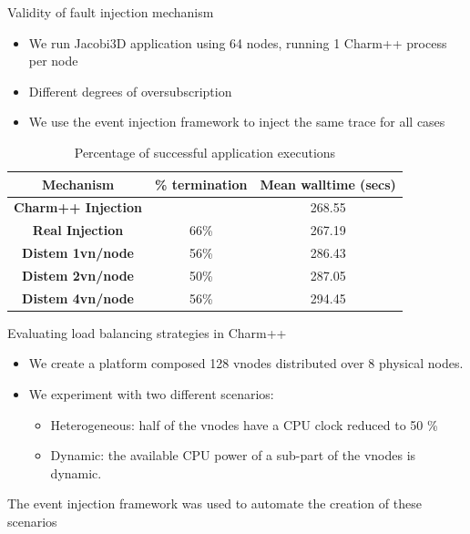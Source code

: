 \documentclass[11pt,xcolor=dvipsnames,presentation]{beamer}
\begin{document}
\begin{frame}[label=sec-2-0-3]{Validity of fault injection mechanism}
\begin{itemize}
\item We run Jacobi3D application using 64 nodes, running 1 Charm++ process per node

\item Different degrees of oversubscription

\item We use the event injection framework to inject the same trace for all cases
\end{itemize}

\begin{table}[ht!]
        \center
  {\scriptsize
  \begin{tabular}{|c|c|c|}
  \hline
    \textbf{Mechanism}  &  \textbf{ \% termination} & \textbf{ Mean walltime
    (secs)} \\
  \hline
  \textbf{Charm++ Injection}  &  \color{red}{100\%} & 268.55\\
  \textbf{Real Injection}  &  66\% & 267.19\\
  \textbf{Distem 1vn/node}  &  56\% & 286.43\\
  \textbf{Distem 2vn/node}  &  50\% & 287.05\\
  \textbf{Distem 4vn/node}  &  56\% & 294.45\\
  \hline
  \end{tabular}
  }
  \caption{Percentage of successful application executions}
  \label{table:FT_validation}
\end{table}
\end{frame}

\begin{frame}[label=sec-2-0-4]{Evaluating load balancing strategies in Charm++}
\begin{itemize}
\item We create a platform composed 128 vnodes distributed over 8 physical nodes.

\item We experiment with two different scenarios:

\begin{itemize}
\item \alert{Heterogeneous}: half of the vnodes have a CPU clock reduced to 50 \%

\item \alert{Dynamic}: the available CPU power of a sub-part of the vnodes is dynamic.
\end{itemize}
\end{itemize}


The event injection framework was used to automate the creation of these scenarios
\end{frame}
\end{document}
